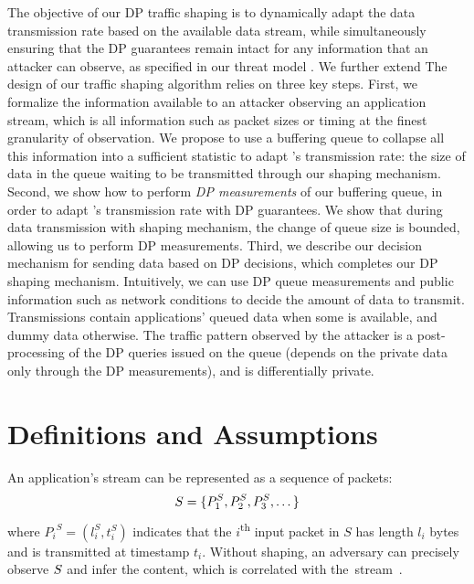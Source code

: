 The objective of our DP traffic shaping is to dynamically adapt the data transmission rate based on the available data stream, while simultaneously ensuring that the DP guarantees remain intact for any information that an attacker can observe, as specified in our threat model {\addref}.
We further extend 
The design of our traffic shaping algorithm relies on three key steps.
%
First, we formalize the information available to an attacker observing an application stream, which is all information such as packet sizes or timing at the finest granularity of observation.
We propose to use a buffering queue to collapse all this information into a sufficient statistic to adapt {\sys}'s transmission rate: the size of data in the queue waiting to be transmitted through our shaping mechanism.
%
Second, we show how to perform {\em DP measurements} of our buffering queue, in order to adapt \sys's transmission rate with DP guarantees.
We show that during data transmission with {\sys} shaping mechanism, the change of queue size is bounded, allowing us to perform DP measurements.
%
Third, we describe our decision mechanism for sending data based on DP decisions, which completes our DP shaping mechanism.
Intuitively, we can use DP queue measurements and public information such as network conditions to decide the amount of data to transmit.
Transmissions contain applications' queued data when some is available, and dummy data otherwise.
The traffic pattern observed by the attacker is a post-processing of the DP queries issued on the queue (depends on the private data only through the DP measurements), and is differentially private.


\section{Definitions and Assumptions}
\label{sec:defs}
An application's stream can be represented as a sequence of packets:
\begin{equation}
    S = \{{P^S_1}, {P^S_2}, {P^S_3}, \dots \}
\end{equation}
where ${P_i}^S = (l^S_i, t^S_i)$ indicates that the $i$\textsuperscript{th} input packet in $S$ has length $l_i$ bytes and is transmitted at timestamp $t_i$.
Without shaping, an adversary can precisely observe $S$ and infer the content, which is correlated with the~stream~\cite{schuster2017beautyburst}.

